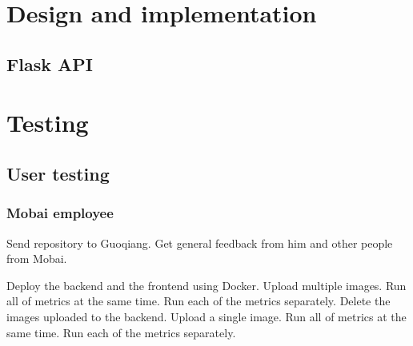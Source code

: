 \section{Design and implementation}

\subsection{Flask API}

\section{Testing}

\subsection{User testing}

\subsubsection{Mobai employee}
Send repository to Guoqiang. Get general feedback from him and other people from Mobai.

Deploy the backend and the frontend using Docker.
Upload multiple images.
Run all of metrics at the same time.
Run each of the metrics separately. 
Delete the images uploaded to the backend.
Upload a single image.
Run all of metrics at the same time.
Run each of the metrics separately. 


